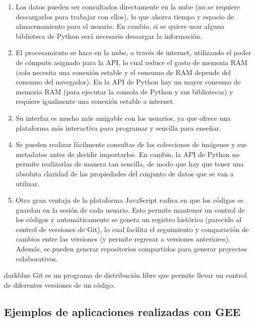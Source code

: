 \documentclass[
  12pt,
  letterpaper,
  twoside]{book}
\providecommand{\tightlist}{%
  \setlength{\itemsep}{0pt}\setlength{\parskip}{0pt}}
\begin{document}
\begin{enumerate}
\def\labelenumi{\arabic{enumi}.}
\tightlist
\item
  Los datos pueden ser consultados directamente en la nube (no se requiere descargarlos para trabajar con ellos), lo que ahorra tiempo y espacio de almacenamiento para el usuario. En cambio, si se quiere usar alguna biblioteca de Python será necesario descargar la información.
\item
  El procesamiento se hace en la nube, a través de internet, utilizando el poder de cómputo asignado para la API, lo cual reduce el gasto de memoria RAM (solo necesita una conexión estable y el consumo de RAM depende del consumo del navegador). En la API de Python hay un mayor consumo de memoria RAM (para ejecutar la consola de Python y sus bibliotecas) y requiere igualmente una conexión estable a internet.
\item
  Su interfaz es mucho más amigable con los usuarios, ya que ofrece una plataforma más interactiva para programar y sencilla para enseñar.
\item
  Se pueden realizar fácilmente consultas de las colecciones de imágenes y sus metadatos antes de decidir importarlos. En cambio, la API de Python no permite realizarlas de manera tan sencilla, de modo que hay que tener una absoluta claridad de las propiedades del conjunto de datos que se van a utilizar.
\item
  Otra gran ventaja de la plataforma JavaScript radica en que los códigos se guardan en la sesión de cada usuario. Esto permite mantener un control de los códigos y automáticamente se genera un registro histórico (parecido al control de versiones de Git), lo cual facilita el seguimiento y comparación de cambios entre las versiones (y permite regresar a versiones anteriores). Además, se pueden generar repositorios compartidos para generar proyectos colaborativos.
\end{enumerate}

\begin{bluebox2}

\begin{awesomeblock}{5pt}{\faLightbulb}{darkblue}
Git es un programa de distribución libre que permite llevar un control de diferentes versiones de un código.

\end{awesomeblock}

\end{bluebox2}

\hypertarget{ejemplos-de-aplicaciones-realizadas-con-gee}{%
\subsection*{Ejemplos de aplicaciones realizadas con GEE}\label{ejemplos-de-aplicaciones-realizadas-con-gee}}
\end{document}
